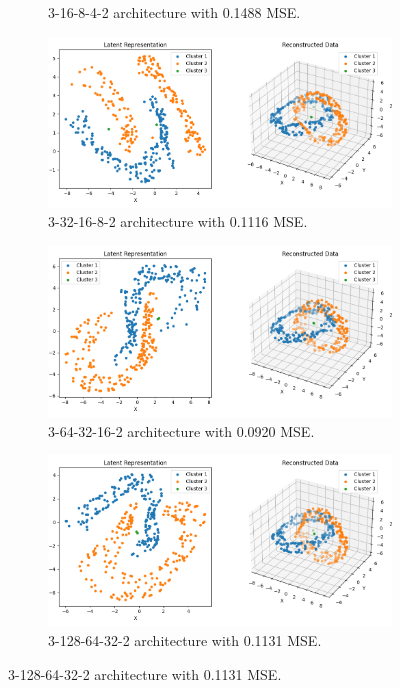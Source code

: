 \begin{figure}[htb]
\begin{subfigure}[b]{0.49\textwidth}
    \caption{3-16-8-4-2 architecture with 0.1488 MSE.}
    \label{fig:3-16-8-4-2}
  \end{subfigure}
  \hfill
  \begin{subfigure}[b]{0.49\textwidth}
    \centering
    \includegraphics[width=\linewidth]{images/RQ1/3-32-16-8-2_0.1116.png}
    \caption{3-32-16-8-2 architecture with \textcolor{green!40!black}{0.1116} MSE.}
    \label{fig:3-32-16-8-2}
  \end{subfigure}
  \hfill  
  \begin{subfigure}[b]{0.49\textwidth}
    \centering
    \includegraphics[width=\linewidth]{images/RQ1/3-64-32-16-2_0.0920.png}
    \caption{3-64-32-16-2 architecture with \textcolor{green!100!black}{0.0920} MSE.}
    \label{fig:3-64-32-16-2}
  \end{subfigure}
  \hfill  
  \begin{subfigure}[b]{0.49\textwidth}
    \centering
    \includegraphics[width=\linewidth]{images/RQ1/3-128-64-32-2_0.1131.png}
    \caption{3-128-64-32-2 architecture with \textcolor{green!20!black}{0.1131} MSE.}
    \label{fig:3-128-64-32-2}
  \end{subfigure}


\end{figure}
